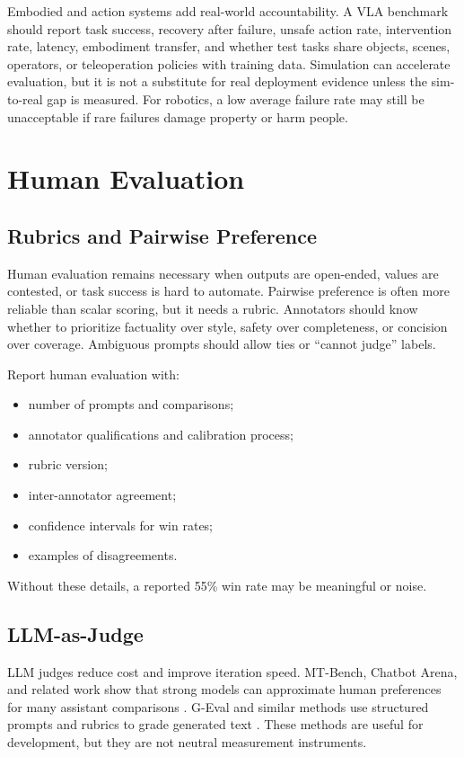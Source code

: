 Embodied and action systems add real-world accountability. A VLA benchmark should report task success, recovery after failure, unsafe action rate, intervention rate, latency, embodiment transfer, and whether test tasks share objects, scenes, operators, or teleoperation policies with training data. Simulation can accelerate evaluation, but it is not a substitute for real deployment evidence unless the sim-to-real gap is measured. For robotics, a low average failure rate may still be unacceptable if rare failures damage property or harm people.

\section{Human Evaluation}
\subsection{Rubrics and Pairwise Preference}
Human evaluation remains necessary when outputs are open-ended, values are contested, or task success is hard to automate. Pairwise preference is often more reliable than scalar scoring, but it needs a rubric. Annotators should know whether to prioritize factuality over style, safety over completeness, or concision over coverage. Ambiguous prompts should allow ties or ``cannot judge'' labels.

Report human evaluation with:
\begin{itemize}
    \item number of prompts and comparisons;
    \item annotator qualifications and calibration process;
    \item rubric version;
    \item inter-annotator agreement;
    \item confidence intervals for win rates;
    \item examples of disagreements.
\end{itemize}
Without these details, a reported 55\% win rate may be meaningful or noise.

\subsection{LLM-as-Judge}
LLM judges reduce cost and improve iteration speed. MT-Bench, Chatbot Arena, and related work show that strong models can approximate human preferences for many assistant comparisons \cite{zheng2023judging,chiang2024chatbot}. G-Eval and similar methods use structured prompts and rubrics to grade generated text \cite{liu2023geval}. These methods are useful for development, but they are not neutral measurement instruments.

